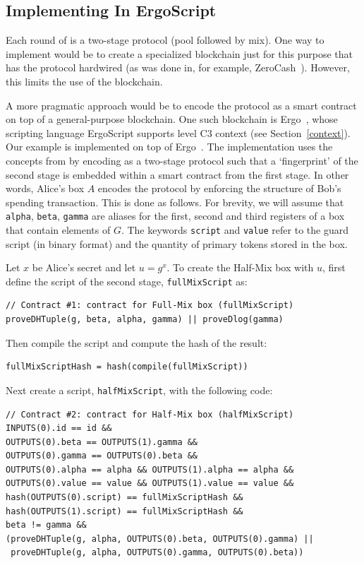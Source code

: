 \documentclass[runningheads]{llncs}
\newcommand{\langname}{ErgoScript\xspace}
\begin{document}
\subsection{Implementing \algname In \langname}
\label{impl}
Each round of \algname is a two-stage protocol (pool followed by mix). One way to implement \algname would be to create a specialized blockchain just for this purpose that has the protocol hardwired (as was done in, for example, ZeroCash~\cite{zcash}). However, this limits the use of the blockchain. 

A more pragmatic approach would be to encode the protocol as a smart contract on top of a general-purpose blockchain. 
One such blockchain is Ergo~\cite{ergo}, whose scripting language \langname supports level C3 context (see Section~\ref{context}). Our example is implemented on top of Ergo~\cite{ergomix-impl}. 
The implementation uses the concepts from \cite{multistage} by encoding \algname as a two-stage protocol such that a `fingerprint' of the second stage is embedded within a smart contract from the first stage. 
In other words, Alice's box $A$ encodes the protocol by enforcing the structure of Bob's spending transaction. 
This is done as follows. For brevity, we will assume that \texttt{alpha}, \texttt{beta}, \texttt{gamma} are aliases for the first, second and third registers of a box that contain elements of $G$. The keywords \texttt{script} and \texttt{value} refer to the guard script (in binary format) and the quantity of primary tokens stored in the box. 

Let $x$ be Alice's secret and let $u = g^x$. To create the Half-Mix box with $u$, first define the script of the second stage, \texttt{fullMixScript} as:
{\small
\begin{Verbatim}[frame=single]
// Contract #1: contract for Full-Mix box (fullMixScript)
proveDHTuple(g, beta, alpha, gamma) || proveDlog(gamma)
\end{Verbatim}
}
Then compile the script and compute the hash of the result:

{\small
\begin{verbatim}
fullMixScriptHash = hash(compile(fullMixScript))
\end{verbatim}
}
Next create a script, \texttt{halfMixScript}, with the following code:
{\small
\begin{Verbatim}[frame=single]
// Contract #2: contract for Half-Mix box (halfMixScript)
INPUTS(0).id == id &&
OUTPUTS(0).beta == OUTPUTS(1).gamma && 
OUTPUTS(0).gamma == OUTPUTS(0).beta && 
OUTPUTS(0).alpha == alpha && OUTPUTS(1).alpha == alpha &&
OUTPUTS(0).value == value && OUTPUTS(1).value == value &&
hash(OUTPUTS(0).script) == fullMixScriptHash &&  
hash(OUTPUTS(1).script) == fullMixScriptHash &&
beta != gamma &&
(proveDHTuple(g, alpha, OUTPUTS(0).beta, OUTPUTS(0).gamma) || 
 proveDHTuple(g, alpha, OUTPUTS(0).gamma, OUTPUTS(0).beta))
\end{Verbatim}
}
\end{document}

